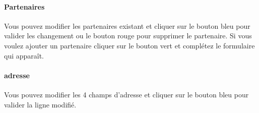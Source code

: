 \documentclass[a4paper, 12pt]{report}
\begin{document}
\paragraph{Partenaires}
Vous pouvez modifier les partenaires existant et cliquer sur le bouton bleu pour valider les changement ou le bouton rouge pour supprimer le partenaire. Si vous voulez ajouter un partenaire cliquer sur le bouton vert et complétez le formulaire qui apparaît.
\paragraph{adresse}
Vous pouvez modifier les 4 champs d'adresse et cliquer sur le bouton bleu pour valider la ligne modifié.
\end{document}
